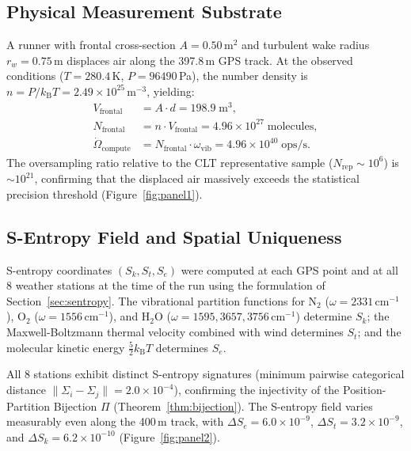 \documentclass[twocolumn,10pt]{article}
\theoremstyle{definition}
\newcommand{\kB}{k_{\mathrm{B}}}
\newcommand{\Sk}{S_k}
\newcommand{\St}{S_t}
\newcommand{\Se}{S_e}
\begin{document}
\subsection{Physical Measurement Substrate}\label{sec:val_substrate}

A runner with frontal cross-section $A = 0.50$\,m$^2$ and turbulent wake radius $r_w = 0.75$\,m displaces air along the 397.8\,m GPS track. At the observed conditions ($T = 280.4$\,K, $P = 96490$\,Pa), the number density is $n = P/\kB T = 2.49 \times 10^{25}$\,m$^{-3}$, yielding:
\begin{align}
    V_{\mathrm{frontal}} &= A \cdot d = 198.9 \; \mathrm{m}^3, \label{eq:val_vol_frontal} \\
    N_{\mathrm{frontal}} &= n \cdot V_{\mathrm{frontal}} = 4.96 \times 10^{27} \; \mathrm{molecules}, \label{eq:val_molecules} \\
    \dot{\Omega}_{\mathrm{compute}} &= N_{\mathrm{frontal}} \cdot \omega_{\mathrm{vib}} = 4.96 \times 10^{40} \; \mathrm{ops/s}. \label{eq:val_compute}
\end{align}
The oversampling ratio relative to the CLT representative sample ($N_{\mathrm{rep}} \sim 10^6$) is $\sim\!10^{21}$, confirming that the displaced air massively exceeds the statistical precision threshold (Figure~\ref{fig:panel1}).

\subsection{S-Entropy Field and Spatial Uniqueness}\label{sec:val_sentropy}

S-entropy coordinates $(\Sk, \St, \Se)$ were computed at each GPS point and at all 8 weather stations at the time of the run using the formulation of Section~\ref{sec:sentropy}. The vibrational partition functions for N$_2$ ($\omega = 2331$\,cm$^{-1}$), O$_2$ ($\omega = 1556$\,cm$^{-1}$), and H$_2$O ($\omega = 1595, 3657, 3756$\,cm$^{-1}$) determine $\Sk$; the Maxwell-Boltzmann thermal velocity combined with wind determines $\St$; and the molecular kinetic energy $\frac{5}{2}\kB T$ determines $\Se$.

All 8 stations exhibit distinct S-entropy signatures (minimum pairwise categorical distance $\|\Sigma_i - \Sigma_j\| = 2.0 \times 10^{-4}$), confirming the injectivity of the Position-Partition Bijection $\Pi$ (Theorem~\ref{thm:bijection}). The S-entropy field varies measurably even along the 400\,m track, with $\Delta\Se = 6.0 \times 10^{-9}$, $\Delta\St = 3.2 \times 10^{-9}$, and $\Delta\Sk = 6.2 \times 10^{-10}$ (Figure~\ref{fig:panel2}).
\end{document}
